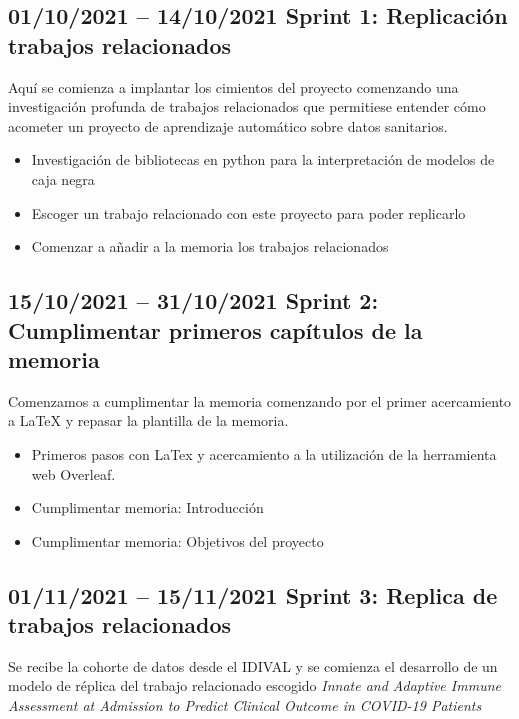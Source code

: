\subsection{01/10/2021 – 14/10/2021 \newline Sprint 1: Replicación trabajos relacionados}

Aquí se comienza a implantar los cimientos del proyecto comenzando una investigación profunda de trabajos relacionados que permitiese entender cómo acometer un proyecto de aprendizaje automático sobre datos sanitarios.

\begin{itemize}
    \item Investigación de bibliotecas en python para la interpretación de modelos de caja negra
    \item Escoger un trabajo relacionado con este proyecto para poder replicarlo
    \item Comenzar a añadir a la memoria los trabajos relacionados
\end{itemize}


\subsection{15/10/2021 – 31/10/2021 \newline Sprint 2: Cumplimentar primeros capítulos de la memoria}

Comenzamos a cumplimentar la memoria comenzando por el primer acercamiento a LaTeX y repasar la plantilla de la memoria.

\begin{itemize}
    \item Primeros pasos con LaTex y acercamiento a la utilización de la herramienta web Overleaf.
    \item Cumplimentar memoria: Introducción
    \item Cumplimentar memoria: Objetivos del proyecto
\end{itemize}


\subsection{01/11/2021 – 15/11/2021 \newline Sprint 3: Replica de trabajos relacionados}

Se recibe la cohorte de datos desde el IDIVAL y se comienza el desarrollo de un modelo de réplica del trabajo relacionado escogido \textit{Innate and Adaptive Immune Assessment at Admission to Predict Clinical Outcome in COVID-19 Patients}\cite{sansegundo:2021}

